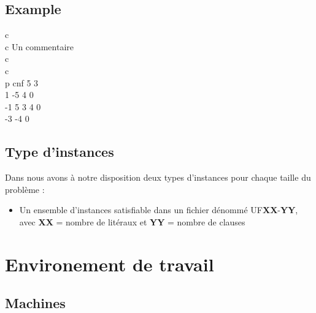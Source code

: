 \subsection{Example}
c\\
c Un commentaire\\
c\\
c \\
p cnf 5 3\\
1 -5 4 0\\
-1 5 3 4 0\\
-3 -4 0\\
\subsection{Type d'instances}
Dans \cite{Benchmark} nous avons à notre disposition deux types d'instances pour chaque taille du problème : \\
\begin{itemize}
	\item Un ensemble d'instances satisfiable dans un fichier dénommé UF\textbf{XX}-\textbf{YY},\\avec \textbf{XX} = nombre de litéraux et \textbf{YY} = nombre de clauses
\end{itemize}
\newpage
\section{Environement de travail}
\subsection{Machines}
